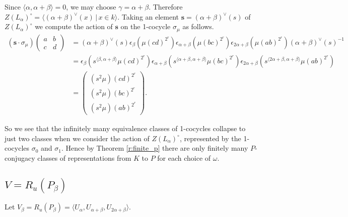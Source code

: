 Since $\langle \alpha, \alpha + \beta\rangle = 0$, we may choose $\gamma = \alpha + \beta$.
Therefore $Z(L_ \alpha)^\circ = \langle (\alpha + \beta)^\vee(x)\,|\,x \in k \rangle$. Taking an element $\mathbf{s} = (\alpha + \beta)^\vee(s)$ of $Z(L_\alpha)^\circ$ we compute the action of $\mathbf{s}$ on the 1-cocycle $\sigma_\mu$ as follows.
\begin{align*}
\left(\mathbf{s}\cdot \sigma_\mu\right)
\left(\begin{matrix} a & b \\ c & d\end{matrix} \right) 
&=
(\alpha + \beta)^\vee(s) \epsilon_\beta \left(\mu (cd)^{2^r} \right)\epsilon_{\alpha+\beta} \left(\mu(bc)^{2^r} \right)\epsilon_{2\alpha + \beta} \left(\mu(ab)^{2^r} \right)(\alpha + \beta)^\vee(s)^{-1}\\
&=  \epsilon_\beta\left(s^{\langle\beta , \alpha+\beta\rangle}\mu (cd)^{2^r} \right)\epsilon_{\alpha+\beta} \left(s^{\langle \alpha+\beta, \alpha+\beta \rangle} \mu(bc)^{2^r} \right)\epsilon_{2\alpha + \beta} \left(s^{\langle 2\alpha+\beta, \alpha+\beta\rangle}\mu(ab)^{2^r}\right) \\
&=
\left(\begin{matrix}
(s^2\mu)(cd)^{2^r} \\
(s^2\mu)(bc)^{2^r} \\
(s^2\mu)(ab)^{2^r}
\end{matrix}\right).
\end{align*}

So we see that the infinitely many equivalence classes of 1-cocycles collapse to just two classes when we consider the action of $Z(L_\alpha)^\circ$, represented by the 1-cocycles $\sigma_0$ and $\sigma_1$. Hence by Theorem \ref{r:finite_p} there are only finitely many $P$-conjugacy classes of representations from $K$ to $P$ for each choice of $\omega$.

\subsection{$V = R_u(P_\beta)$}
\label{b2:beta}

Let $V_\beta = R_u(P_\beta) = \langle U_\alpha, U_{\alpha + \beta}, U_{2\alpha + \beta} \rangle$.


